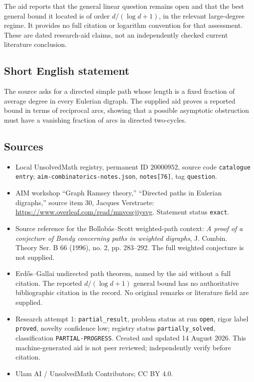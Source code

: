\documentclass[11pt]{article}
\begin{document}
The aid reports that the general linear question remains open and that the best general bound it located is of order \(d/(\log d+1)\), in the relevant large-degree regime. It provides no full citation or logarithm convention for that assessment. These are dated research-aid claims, not an independently checked current literature conclusion.
\subsection{Short English statement}
The source asks for a directed simple path whose length is a fixed fraction of average degree in every Eulerian digraph. The supplied aid proves a reported bound in terms of reciprocal arcs, showing that a possible asymptotic obstruction must have a vanishing fraction of arcs in directed two-cycles.
\subsection{Sources}
\begin{itemize}
\item Local UnsolvedMath registry, permanent ID \(20000952\), source code \texttt{catalogue entry}; \texttt{aim-combinatorics-notes.json}, \texttt{notes[76]}, tag \texttt{question}.
\item AIM workshop ``Graph Ramsey theory,'' ``Directed paths in Eulerian digraphs,'' source item 30, Jacques Verstraete: \url{https://www.overleaf.com/read/mnvcscjjysvg}. Statement status \texttt{exact}.
\item Source reference for the Bollob\'as--Scott weighted-path context: \emph{A proof of a conjecture of Bondy concerning paths in weighted digraphs}, J. Combin. Theory Ser. B 66 (1996), no. 2, pp. 283--292. The full weighted conjecture is not supplied.
\item Erd\H{o}s--Gallai undirected path theorem, named by the aid without a full citation. The reported \(d/(\log d+1)\) general bound has no authoritative bibliographic citation in the record. No original remarks or literature field are supplied.
\item Research attempt 1: \texttt{partial\_result}, problem status at run \texttt{open}, rigor label \texttt{proved}, novelty confidence low; registry status \texttt{partially\_solved}, classification \texttt{PARTIAL-PROGRESS}. Created and updated 14 August 2026. This machine-generated aid is not peer reviewed; independently verify before citation.
\item Ulam AI / UnsolvedMath Contributors; CC BY 4.0.
\end{itemize}
\end{document}
